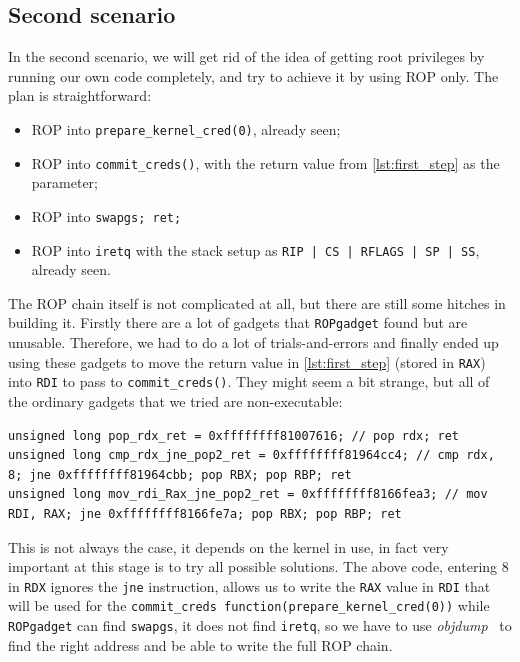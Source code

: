 \documentclass{masterthesis}
\begin{document}
\subsection{Second scenario}
\label{subsect:second scenario}
In the second scenario, we will get rid of the idea of getting root privileges by running our own code completely, and try to achieve it by using ROP only. The plan is straightforward:
\begin{itemize} 
\item ROP into \texttt{prepare\_kernel\_cred(0)}, already seen;
\item ROP into \texttt{commit\_creds()}, with the return value from \ref{lst:first_step} as the parameter;
\item ROP into \texttt{swapgs; ret;}
\item ROP into \texttt{iretq} with the stack setup as \texttt{RIP | CS | RFLAGS | SP | SS}, already seen.
\end{itemize}
The ROP chain itself is not complicated at all, but there are still some hitches in building it. Firstly there are a lot of gadgets that \texttt{ROPgadget} found but are unusable. Therefore, we had to do a lot of trials-and-errors and finally ended up using these gadgets to move the return value in \ref{lst:first_step} (stored in \texttt{RAX}) into \texttt{RDI} to pass to \texttt{commit\_creds()}. They might seem a bit strange, but all of the ordinary gadgets that we tried are non-executable:
\begin{lstlisting}
unsigned long pop_rdx_ret = 0xffffffff81007616; // pop rdx; ret
unsigned long cmp_rdx_jne_pop2_ret = 0xffffffff81964cc4; // cmp rdx, 8; jne 0xffffffff81964cbb; pop RBX; pop RBP; ret
unsigned long mov_rdi_Rax_jne_pop2_ret = 0xffffffff8166fea3; // mov RDI, RAX; jne 0xffffffff8166fe7a; pop RBX; pop RBP; ret
\end{lstlisting}
This is not always the case, it depends on the kernel in use, in fact very important at this stage is to try all possible solutions.
The above code, entering 8 in \texttt{RDX} ignores the \texttt{jne} instruction, allows us to write the \texttt{RAX} value in \texttt{RDI} that will be used for the \texttt{commit\_creds function(prepare\_kernel\_cred(0))}
while \texttt{ROPgadget} can find \texttt{swapgs}, it does not find \texttt{iretq}, so we have to use \emph{objdump}~\cite{weatherspoonassemblers} to find the right address and be able to write the full ROP chain.
\end{document}
